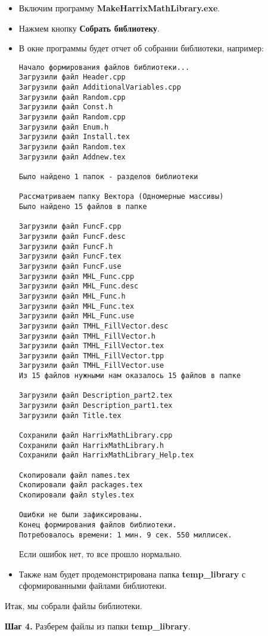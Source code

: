 \documentclass[a4paper,12pt]{article}
\begin{document}
\begin{itemize}
\item Включим программу \textbf{MakeHarrixMathLibrary.exe}.
\item Нажмем кнопку \textbf{Собрать библиотеку}.
\item В окне программы будет отчет об собрании библиотеки, например:
\begin{lstlisting}[label=examplereport, caption=Пример отчета о сборке библиотеки]
Начало формирования файлов библиотеки...
Загрузили файл Header.cpp
Загрузили файл AdditionalVariables.cpp
Загрузили файл Random.cpp
Загрузили файл Const.h
Загрузили файл Random.cpp
Загрузили файл Enum.h
Загрузили файл Install.tex
Загрузили файл Random.tex
Загрузили файл Addnew.tex

Было найдено 1 папок - разделов библиотеки

Рассматриваем папку Вектора (Одномерные массивы)
Было найдено 15 файлов в папке

Загрузили файл FuncF.cpp
Загрузили файл FuncF.desc
Загрузили файл FuncF.h
Загрузили файл FuncF.tex
Загрузили файл FuncF.use
Загрузили файл MHL_Func.cpp
Загрузили файл MHL_Func.desc
Загрузили файл MHL_Func.h
Загрузили файл MHL_Func.tex
Загрузили файл MHL_Func.use
Загрузили файл TMHL_FillVector.desc
Загрузили файл TMHL_FillVector.h
Загрузили файл TMHL_FillVector.tex
Загрузили файл TMHL_FillVector.tpp
Загрузили файл TMHL_FillVector.use
Из 15 файлов нужными нам оказалось 15 файлов в папке

Загрузили файл Description_part2.tex
Загрузили файл Description_part1.tex
Загрузили файл Title.tex

Сохранили файл HarrixMathLibrary.cpp
Сохранили файл HarrixMathLibrary.h
Сохранили файл HarrixMathLibrary_Help.tex

Скопировали файл names.tex
Скопировали файл packages.tex
Скопировали файл styles.tex

Ошибки не были зафиксированы.
Конец формирования файлов библиотеки.
Потребовалось времени: 1 мин. 9 сек. 550 миллисек.
\end{lstlisting}

Если ошибок нет, то все прошло нормально.
\item Также нам будет продемонстрирована папка \textbf{temp\_library} с сформированными файлами библиотеки.
\end{itemize}

Итак, мы собрали файлы библиотеки.

\textbf{Шаг 4.}\label{step4} Разберем файлы из папки \textbf{temp\_library}.
\end{document}
